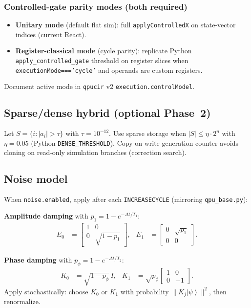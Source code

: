\documentclass[11pt,a4paper]{article}
\newcommand{\ket}[1]{\left|#1\right\rangle}
\begin{document}
\subsubsection{Controlled-gate parity modes (both required)}

\begin{itemize}
  \item \textbf{Unitary mode} (default flat sim): full \texttt{applyControlledX} on state-vector indices (current React).
  \item \textbf{Register-classical mode} (cycle parity): replicate Python \texttt{apply\_controlled\_gate} threshold on register slices when \texttt{executionMode==='cycle'} and operands are custom registers.
\end{itemize}
Document active mode in \texttt{qpucir} v2 \texttt{execution.controlModel}.

\subsection{Sparse/dense hybrid (optional Phase~2)}

Let $S=\{i : |a_i|>\tau\}$ with $\tau=10^{-12}$. Use sparse storage when $|S|\le \eta\cdot 2^n$ with $\eta=0.05$ (Python \texttt{DENSE\_THRESHOLD}). Copy-on-write generation counter avoids cloning on read-only simulation branches (correction search).

\subsection{Noise model}

When \texttt{noise.enabled}, apply after each \texttt{INCREASECYCLE} (mirroring \texttt{qpu\_base.py}):

\textbf{Amplitude damping} with $p_1 = 1 - e^{-\Delta t / T_1}$:
\begin{align}
  E_0 &= \begin{bmatrix}1&0\\0&\sqrt{1-p_1}\end{bmatrix}, &
  E_1 &= \begin{bmatrix}0&\sqrt{p_1}\\0&0\end{bmatrix}.
\end{align}

\textbf{Phase damping} with $p_\phi = 1 - e^{-\Delta t / T_2}$:
\begin{align}
  K_0 &= \sqrt{1-p_\phi}\, I, &
  K_1 &= \sqrt{p_\phi}\begin{bmatrix}1&0\\0&-1\end{bmatrix}.
\end{align}
Apply stochastically: choose $K_0$ or $K_1$ with probability $\|K_j\ket{\psi}\|^2$, then renormalize.
\end{document}
